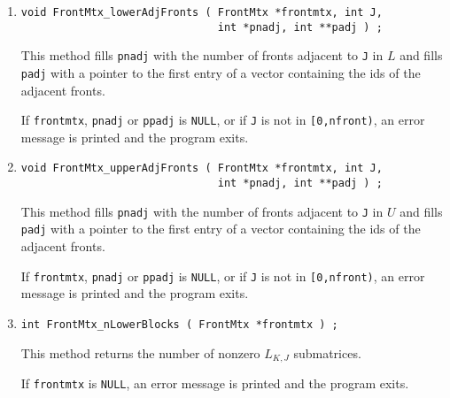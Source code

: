 \begin{enumerate}
If $K = nfront$, then the object containing $L_{\bnd{J},J}$ is
returned.
\par {}
If {\tt frontmtx} is {\tt NULL},
or if {\tt J} is not in {\tt [0,nfront)},
or if {\tt K} is not in {\tt [0,nfront]},
an error message is printed and the program exits.
\item
\begin{verbatim}
void FrontMtx_lowerAdjFronts ( FrontMtx *frontmtx, int J, 
                               int *pnadj, int **padj ) ;
\end{verbatim}
This method fills {\tt *pnadj} with the number of fronts adjacent to 
{\tt J} in $L$ and fills {\tt *padj} with a pointer to the first
entry of a vector containing the ids of the adjacent fronts.
\par {}
If {\tt frontmtx}, {\tt pnadj} or {\tt ppadj} is {\tt NULL},
or if {\tt J} is not in {\tt [0,nfront)},
an error message is printed and the program exits.
\item
\begin{verbatim}
void FrontMtx_upperAdjFronts ( FrontMtx *frontmtx, int J, 
                               int *pnadj, int **padj ) ;
\end{verbatim}
This method fills {\tt *pnadj} with the number of fronts adjacent to 
{\tt J} in $U$ and fills {\tt *padj} with a pointer to the first
entry of a vector containing the ids of the adjacent fronts.
\par {}
If {\tt frontmtx}, {\tt pnadj} or {\tt ppadj} is {\tt NULL},
or if {\tt J} is not in {\tt [0,nfront)},
an error message is printed and the program exits.
\item
\begin{verbatim}
int FrontMtx_nLowerBlocks ( FrontMtx *frontmtx ) ;
\end{verbatim}
This method returns the number of nonzero $L_{K,J}$ submatrices.
\par {}
If {\tt frontmtx} is {\tt NULL},
an error message is printed and the program exits.

\end{enumerate}
